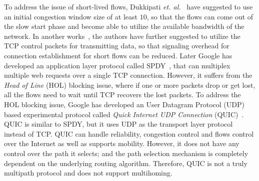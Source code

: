 To address the issue of short-lived flows, Dukkipati \textit{et. al.}~\cite{largecwnd} have suggested to use an initial congestion window size of at least $10$, so that the flows can come out of the slow start phase and become able to utilize the available bandwidth of the network. In another works~\cite{fastopen}, the authors have further suggested to utilize the TCP control packets for transmitting data, so that signaling overhead for connection establishment for short flows can be reduced. Later Google has developed an application layer protocol called SPDY~\cite{spdy}, that can multiplex multiple web requests over a single TCP connection. However, it suffers from the {\em Head of Line} (HOL) blocking issue, where if one or more packets drop or get lost, all the flows need to wait until TCP recovers the lost packets. To address the HOL blocking issue, Google has developed an User Datagram Protocol (UDP) based experimental protocol called {\em Quick Internet UDP Connection} (QUIC)~\cite{carlucci2015http,cui2017innovating}. QUIC is similar to SPDY, but it uses UDP as the transport layer protocol instead of TCP. QUIC can handle reliability, congestion control and flows control over the Internet as well as supports mobility. However, it does not have any control over the path it selects; and the path selection mechanism is completely dependent on the underlying routing algorithm. Therefore, QUIC is not a truly multipath protocol and does not support multihoming.


